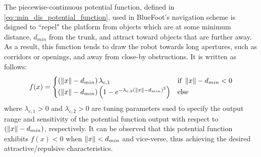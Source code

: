 The piecewise-continuous potential function, defined in \ref{eq::min_dis_potential_function}, used in BlueFoot's navigation scheme is dsigned to ``repel" the platform from objects which are at some minimum distance, $d_{min}$ from the trunk, and attract toward objects that are further away. As a result, this function tends to draw the robot towards long apertures, such as corridors or openings, and away from close-by obstructions. It is written as follows:
	\begin{equation}
		f(x) = 
		\begin{cases}	
		 	\left(\left\lVert x\right\rVert-d_{min}\right) \lambda_{c,1}	&  \text{if } \left\lVert x\right\rVert-d_{min} < 0 \\
							\left(\left\lVert x\right\rVert-d_{min}\right) \left( 1  - e^{ -  \lambda_{c,2} { \left(\left\lVert x\right\rVert-d_{min}\right) }^{2} } \right) 	&  \text{else}
		\end{cases}
	\label{eq::min_dis_potential_function}
	\end{equation}
where $\lambda_{c,1}>0$ and $\lambda_{c,2}>0$ are tuning parameters sued to specify the output range and sensitivity of the potential function output with respect to $\left(\left\lVert x\right\rVert-d_{min}\right)$, respectively. It can be observed that this potential function exhibits $f(x)<0$ when $\left\lVert x\right\rVert < d_{min}$ and vice-verse, thus achieving the desired attractive/repulsive characteristics. 

